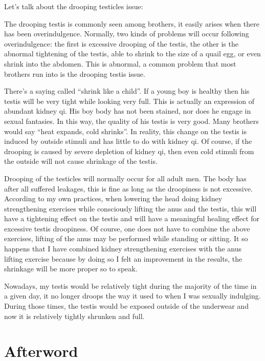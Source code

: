 \documentclass[
]{book}
\begin{document}
Let's talk about the drooping testicles issue:

The drooping testis is commonly seen among brothers, it easily arises when there has been overindulgence. Normally, two kinds of problems will occur following overindulgence: the first is excessive drooping of the testis, the other is the abnormal tightening of the testis, able to shrink to the size of a quail egg, or even shrink into the abdomen. This is abnormal, a common problem that most brothers run into is the drooping testis issue.

There's a saying called ``shrink like a child''. If a young boy is healthy then his testis will be very tight while looking very full. This is actually an expression of abundant kidney qi. His boy body has not been stained, nor does he engage in sexual fantasies. In this way, the quality of his testis is very good. Many brothers would say ``heat expands, cold shrinks''. In reality, this change on the testis is induced by outside stimuli and has little to do with kidney qi. Of course, if the drooping is caused by severe depletion of kidney qi, then even cold stimuli from the outside will not cause shrinkage of the testis.

Drooping of the testicles will normally occur for all adult men. The body has after all suffered leakages, this is fine as long as the droopiness is not excessive. According to my own practices, when lowering the head doing kidney strengthening exercises while consciously lifting the anus and the testis, this will have a tightening effect on the testis and will have a meaningful healing effect for excessive testis droopiness. Of course, one does not have to combine the above exercises, lifting of the anus may be performed while standing or sitting. It so happens that I have combined kidney strengthening exercises with the anus lifting exercise because by doing so I felt an improvement in the results, the shrinkage will be more proper so to speak.

Nowadays, my testis would be relatively tight during the majority of the time in a given day, it no longer droops the way it used to when I was sexually indulging. During those times, the testis would be exposed outside of the underwear and now it is relatively tightly shrunken and full.

\hypertarget{afterword-2}{%
\section{Afterword}\label{afterword-2}}
\end{document}
